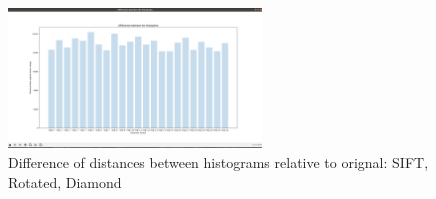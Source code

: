 \documentclass[conference]{IEEEtran}
\begin{document}
\begin{figure}[!htp]
\includegraphics[width=0.6\textwidth]{../programme/results/Task_1/rotated_experiements/SIFT/diamond/experiment_three_comparing differnces between histograms.png}
\centering
\caption{Difference of distances between histograms relative to orignal: SIFT, Rotated, Diamond}
\label{Difference of distances between histograms relative to orignal: SIFT, Rotated, Diamond}
\end{figure}
\end{document}
